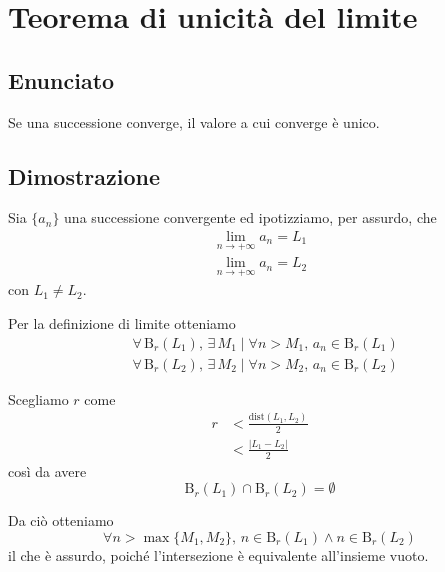 \documentclass[../../dimostrazioni]{subfiles}
\begin{document}
    \chapter{Teorema di unicità del limite}

        \section*{Enunciato}

            Se una successione converge, il valore a cui converge è unico.

        \section*{Dimostrazione}

            Sia \(\{a_n\}\) una successione convergente ed ipotizziamo, per assurdo, che
            \begin{align*}
                \lim_{n \to +\infty} a_n = L_1\\
                \lim_{n \to +\infty} a_n = L_2
            \end{align*}
            con \(L_1 \neq L_2\).

            Per la definizione di limite otteniamo
            \begin{align*}
                &\forall \, \mathrm{B}_r (L_1), \, \exists \, M_1 \; | \; \forall n > M_1, \, a_n \in \mathrm{B}_r (L_1)\\
                &\forall \, \mathrm{B}_r (L_2), \, \exists \, M_2 \; | \; \forall n > M_2, \, a_n \in \mathrm{B}_r (L_2)
            \end{align*}

            Scegliamo \(r\) come
            \begin{align*}
                r &< \frac{\mathrm{dist} (L_1, L_2)}{2}\\
                &< \frac{|L_1 - L_2|}{2}
            \end{align*}
            così da avere
            \[
                \mathrm{B}_r (L_1) \cap \mathrm{B}_r (L_2) = \emptyset
            \]

            Da ciò otteniamo
            \[
                \forall n > \max\{M_1, M_2\}, \, n \in \mathrm{B}_r (L_1) \land n \in \mathrm{B}_r (L_2)
            \]
            il che è assurdo, poiché l'intersezione è equivalente all'insieme vuoto.
    
\end{document}
